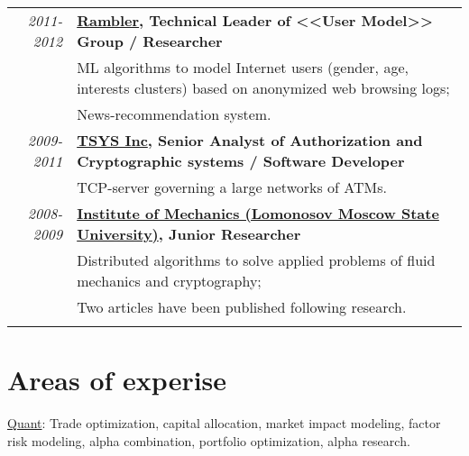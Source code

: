 \documentclass[unicode,a4paper,10pt]{article}
\begin{document}
\begin{tabular}{r p{13cm}}
 \emph{\textsc{2011-2012}} & \textbf{\href{http://www.rambler.ru}{Rambler}, Technical Leader of <<User Model>> Group / Researcher} \\
&\footnotesize{ML algorithms to model Internet users (gender, age, interests clusters) based on anonymized web browsing logs;}\\
&\footnotesize{News-recommendation system.}\\

 \emph{\textsc{2009-2011}} & \textbf{\href{http://www.tsys.com}{TSYS Inc}, Senior Analyst of Authorization and Cryptographic systems / Software Developer} \\
&\footnotesize{TCP-server governing a large networks of ATMs.} \\

 
 \emph{\textsc{2008-2009}} & \textbf{\href{http://www.imec.msu.ru/}{Institute of Mechanics (Lomonosov Moscow State University)}, Junior Researcher} \\
&\footnotesize{Distributed algorithms to solve applied problems of fluid mechanics and cryptography;}\\
&\footnotesize{Two articles have been published following research.}\\ 
\multicolumn{2}{c}{} 
\end{tabular}

\section{Areas of experise}
\underline{Quant}: Trade optimization, capital allocation, market impact modeling, factor risk modeling, alpha combination, portfolio optimization, alpha research.
\end{document}
